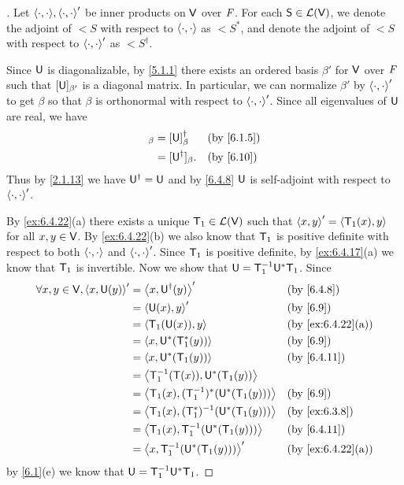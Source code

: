 \begin{proof}[]
	Let \(\inn{\cdot, \cdot}, \inn{\cdot, \cdot}'\) be inner products on \(\mathsf{V}\) over \(\mathit{F}\).
	For each \(\mathsf{S} \in \mathcal{L}(\mathsf{V})\), we denote the adjoint of \(\lt{S}\) with respect to \(\left\langle\cdot, \cdot\right\rangle\) as \(\lt{S}^*\), and denote the adjoint of \(\lt{S}\) with respect to \(\left\langle\cdot, \cdot\right\rangle'\) as \(\lt{S}^{\dag}\).

	Since \(\mathsf{U}\) is diagonalizable, by \cref{5.1.1} there exists an ordered basis \(\beta'\) for \(\mathsf{V}\) over \(\mathit{F}\) such that \([\mathsf{U}]_{\beta'}\) is a diagonal matrix.
	In particular, we can normalize \(\beta'\) by \(\left\langle\cdot, \cdot\right\rangle'\) to get \(\beta\) so that \(\beta\) is orthonormal with respect to \(\left\langle\cdot, \cdot\right\rangle'\).
	Since all eigenvalues of \(\mathsf{U}\) are real, we have
	\begin{align*}
		[\U]_{\beta} & = [\U]_{\beta}^{\dag}  &  & \by{6.1.5} \\
		             & = [\U^{\dag}]_{\beta}. &  & \by{6.10}
	\end{align*}
	Thus by \cref{2.1.13} we have \(\mathsf{U}^{\dag} = \mathsf{U}\) and by \cref{6.4.8} \(\mathsf{U}\) is self-adjoint with respect to \(\left\langle\cdot, \cdot\right\rangle'\).

	By \cref{ex:6.4.22}(a) there exists a unique \(\mathsf{T}_1 \in \mathcal{L}(\mathsf{V})\) such that \(\left\langle x, y\right\rangle' = \left\langle\mathsf{T}_1(x), y\right\rangle\) for all \(x, y \in \mathsf{V}\).
	By \cref{ex:6.4.22}(b) we also know that \(\mathsf{T}_1\) is positive definite with respect to both \(\left\langle\cdot, \cdot\right\rangle\) and \(\left\langle\cdot, \cdot\right\rangle'\).
	Since \(\mathsf{T}_1\) is positive definite, by \cref{ex:6.4.17}(a) we know that \(\mathsf{T}_1\) is invertible.
	Now we show that \(\mathsf{U} = \mathsf{T}_1^{-1} \mathsf{U}^* \mathsf{T}_1\).
	Since
	\begin{align*}
		\forall x, y \in \V, \inn{x, \U(y)}' & = \inn{x, \U^{\dag}(y)}'                      &  & \by{6.4.8}        \\
		                                     & = \inn{\U(x), y}'                             &  & \by{6.9}          \\
		                                     & = \inn{\T_1(\U(x)), y}                        &  & \by{ex:6.4.22}[a] \\
		                                     & = \inn{x, \U^*(\T_1^*(y))}                    &  & \by{6.9}          \\
		                                     & = \inn{x, \U^*(\T_1(y))}                      &  & \by{6.4.11}       \\
		                                     & = \inn{\T_1^{-1}(\T(x)), \U^*(\T_1(y))}                              \\
		                                     & = \inn{\T_1(x), (\T_1^{-1})^*(\U^*(\T_1(y)))} &  & \by{6.9}          \\
		                                     & = \inn{\T_1(x), (\T_1^*)^{-1}(\U^*(\T_1(y)))} &  & \by{ex:6.3.8}     \\
		                                     & = \inn{\T_1(x), \T_1^{-1}(\U^*(\T_1(y)))}     &  & \by{6.4.11}       \\
		                                     & = \inn{x, \T_1^{-1}(\U^*(\T_1(y)))}'          &  & \by{ex:6.4.22}[a]
	\end{align*}
	by \cref{6.1}(e) we know that \(\mathsf{U} = \mathsf{T}_1^{-1} \mathsf{U}^* \mathsf{T}_1\).


\end{proof}
